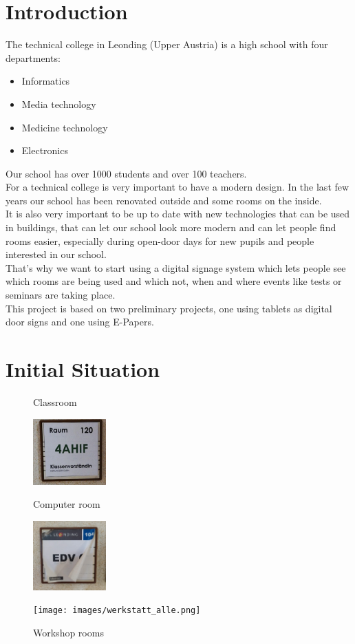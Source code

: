 \documentclass{article}
\newenvironment{explanation}{%
   \color{black}
}{}
\begin{document}
\section{Introduction}
\begin{explanation}
The technical college in Leonding (Upper Austria) is a high school with four departments: 
\begin{itemize}
  \item Informatics
  \item Media technology
  \item Medicine technology
  \item Electronics
\end{itemize}
Our school has over 1000 students and over 100 teachers.\\
For a technical college is very important to have a modern design. In the last few years our school has been renovated outside and some rooms on the inside.\\
It is also very important to be up to date with new technologies that can be used in buildings, that can let our school look more modern and can let people find rooms easier, especially during open-door days for new pupils and people interested in our school. \\
That’s why we want to start using a digital signage system which lets people see which rooms are being used and which not, when and where events like tests or seminars are taking place.\\
This project is based on two preliminary projects, one using tablets as digital door signs and one using E-Papers.
\end{explanation}
\pagebreak

\section{Initial Situation}

\begin{figure} %
    \centering
     \caption{Classroom}
    \includegraphics[width=0.25\textwidth]{images/klassenraum_alt.png}
    \caption{Computer room}
    \includegraphics[width=0.25\textwidth]{images/edv.png}
   \caption{Workshop rooms}
    \texttt{[image: images/werkstatt\_alle.png]}
\end{figure}
\vspace{1.2cm}
\end{document}

